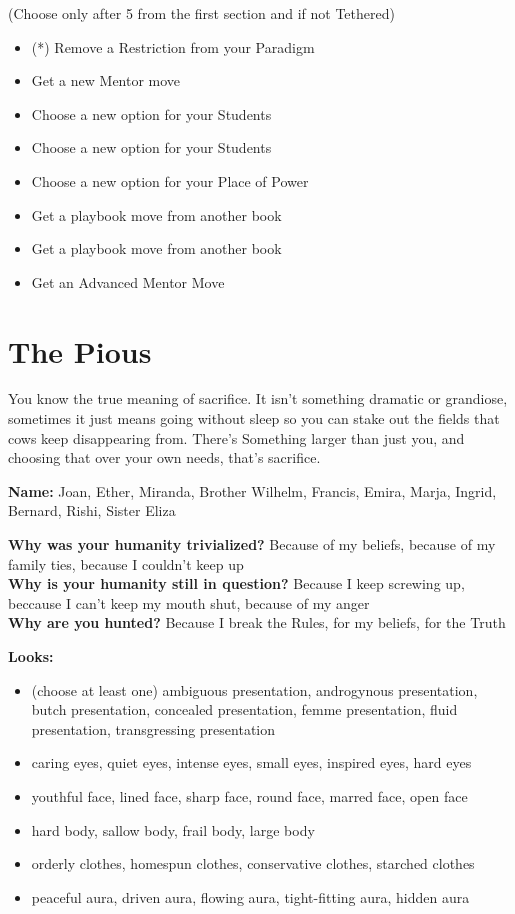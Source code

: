 \documentclass[
  oneside,
  statementpaper,
  9pt]{memoir}
\begin{document}
(Choose only after 5 from the first section and if not Tethered)

\begin{itemize}
\tightlist
\item
  (*) Remove a Restriction from your Paradigm
\item
  Get a new Mentor move
\item
  Choose a new option for your Students
\item
  Choose a new option for your Students
\item
  Choose a new option for your Place of Power
\item
  Get a playbook move from another book
\item
  Get a playbook move from another book
\item
  Get an Advanced Mentor Move
\end{itemize}

\newpage

\hypertarget{the-pious}{%
\section{The Pious}\label{the-pious}}

You know the true meaning of sacrifice. It isn't something dramatic or
grandiose, sometimes it just means going without sleep so you can stake
out the fields that cows keep disappearing from. There's Something
larger than just you, and choosing that over your own needs, that's
sacrifice.

\textbf{Name:} Joan, Ether, Miranda, Brother Wilhelm, Francis, Emira,
Marja, Ingrid, Bernard, Rishi, Sister Eliza

\textbf{Why was your humanity trivialized?} Because of my beliefs,
because of my family ties, because I couldn't keep up\\
\textbf{Why is your humanity still in question?} Because I keep screwing
up, beccause I can't keep my mouth shut, because of my anger\\
\textbf{Why are you hunted?} Because I break the Rules, for my beliefs,
for the Truth

\textbf{Looks:}

\begin{itemize}
\tightlist
\item
  (choose at least one) ambiguous presentation, androgynous
  presentation, butch presentation, concealed presentation, femme
  presentation, fluid presentation, transgressing presentation
\item
  caring eyes, quiet eyes, intense eyes, small eyes, inspired eyes, hard
  eyes
\item
  youthful face, lined face, sharp face, round face, marred face, open
  face
\item
  hard body, sallow body, frail body, large body
\item
  orderly clothes, homespun clothes, conservative clothes, starched
  clothes
\item
  peaceful aura, driven aura, flowing aura, tight-fitting aura, hidden
  aura
\end{itemize}
\end{document}
